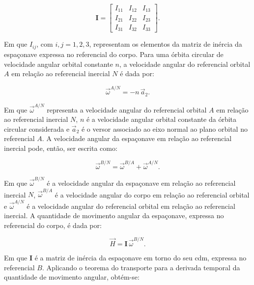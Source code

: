 \begin{equation}
\mathbf{I}=
\begin{bmatrix}
I_{11} & I_{12} & I_{13}\\
I_{21} & I_{22} & I_{23}\\
I_{31} & I_{32} & I_{33}
\end{bmatrix}.
\label{eq_inercia_expandida_corpo}
\end{equation}

Em que $I_{ij}$, com $i,j=1,2,3$, representam os elementos da matriz de inércia da espaçonave expressa no referencial do corpo.
Para uma órbita circular de velocidade angular orbital constante $n$, a velocidade angular do referencial orbital $A$ em relação ao referencial inercial $N$ é dada por:

\begin{equation}
\vec{\omega}^{A/N} = -n\,\vec{a}_2.
\label{eq_omega_A_N}
\end{equation}

Em que $\vec{\omega}^{A/N}$ representa a velocidade angular do referencial orbital $A$ em relação ao referencial inercial $N$, $n$ é a velocidade angular orbital constante da órbita circular considerada e $\vec{a}_2$ é o versor associado ao eixo normal ao plano orbital no referencial $A$.
A velocidade angular da espaçonave em relação ao referencial inercial pode, então, ser escrita como:

\begin{equation}
\vec{\omega}^{B/N} = \vec{\omega}^{B/A} + \vec{\omega}^{A/N}.
\label{eq_omega_B_N_decomp}
\end{equation}

Em que $\vec{\omega}^{B/N}$ é a velocidade angular da espaçonave em relação ao referencial inercial $N$, $\vec{\omega}^{B/A}$ é a velocidade angular do corpo em relação ao referencial orbital e $\vec{\omega}^{A/N}$ é a velocidade angular do referencial orbital em relação ao referencial inercial.
A quantidade de movimento angular da espaçonave, expressa no referencial do corpo, é dada por:

\begin{equation}
\vec{H} = \mathbf{I}\,\vec{\omega}^{B/N}.
\label{eq_H_corpo_orbita}
\end{equation}

Em que $\mathbf{I}$ é a matriz de inércia da espaçonave em torno do seu \gls{cdm}, expressa no referencial $B$.
Aplicando o teorema do transporte para a derivada temporal da quantidade de movimento angular, obtém-se:

